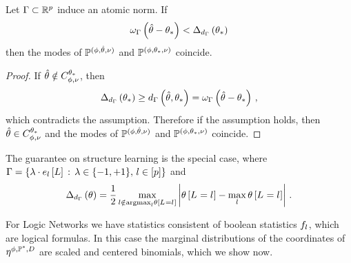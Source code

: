 \begin{theorem}
    Let $\Gamma\subset\mathbb{R}^{p}$ induce an atomic norm.
    If
    \begin{align*}
        \omega_{\Gamma}\left(\hat{\theta}-\theta_{*}\right) < \Delta_{d_{\Gamma}}\left(\theta_{*}\right)
    \end{align*}
    then the modes of $\mathbb{P}^{(\phi,\hat{\theta},\nu)}$ and $\mathbb{P}^{(\phi,\theta_{*},\nu)}$ coincide.
\end{theorem}
\begin{proof}
    If $\hat{\theta}\notin C_{\phi,\nu}^{\theta_{*}}$, then
    \begin{align*}
        \Delta_{d_{\Gamma}}\left(\theta_{*}\right) \geq d_{\Gamma}\left(\hat{\theta},\theta_{*}\right) = \omega_{\Gamma}\left(\hat{\theta}-\theta_{*}\right) \, ,
    \end{align*}
    which contradicts the assumption.
    Therefore if the assumption holds, then $\hat{\theta}\in C_{\phi,\nu}^{\theta_{*}}$ and the modes of $\mathbb{P}^{(\phi,\hat{\theta},\nu)}$ and $\mathbb{P}^{(\phi,\theta_{*},\nu)}$ coincide.
\end{proof}

The guarantee on structure learning is the special case, where $\Gamma=\{\lambda\cdot e_{l}\left[L\right] \,:\, \lambda\in\{-1,+1\},\, l\in[p]\}$ and
\begin{align*}
     \Delta_{d_{\Gamma}}\left(\theta\right)
     = \frac{1}{2} \max_{l\notin\mathrm{argmax}_{l}\theta\left[L_{}=l_{}\right]} \left| \theta\left[L_{}=l_{}\right] - \max_{l}\theta\left[L_{}=l_{}\right] \right| \, .
\end{align*}






For Logic Networks we have statistics consistent of boolean statistics $f_{l}$, which are logical formulas.
In this case the marginal distributions of the coordinates of $\eta^{\phi,\mathbb{P}^*,D}$ are scaled and centered binomials, which we show now.

